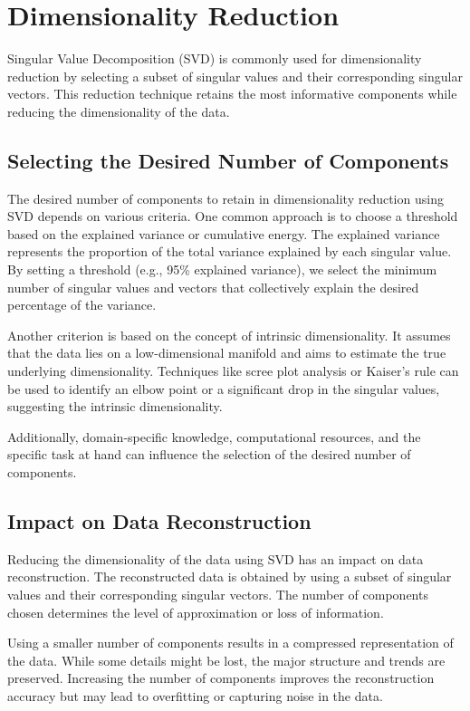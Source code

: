 \documentclass[a4paper]{article}
\begin{document}
{		\section{Dimensionality Reduction}
		Singular Value Decomposition (SVD) is commonly used for dimensionality reduction by selecting a subset of singular values and their corresponding singular vectors. This reduction technique retains the most informative components while reducing the dimensionality of the data.
		
		\subsection{Selecting the Desired Number of Components}
		The desired number of components to retain in dimensionality reduction using SVD depends on various criteria. One common approach is to choose a threshold based on the explained variance or cumulative energy. The explained variance represents the proportion of the total variance explained by each singular value. By setting a threshold (e.g., 95\% explained variance), we select the minimum number of singular values and vectors that collectively explain the desired percentage of the variance.
		
		Another criterion is based on the concept of intrinsic dimensionality. It assumes that the data lies on a low-dimensional manifold and aims to estimate the true underlying dimensionality. Techniques like scree plot analysis or Kaiser's rule can be used to identify an elbow point or a significant drop in the singular values, suggesting the intrinsic dimensionality.
		
		Additionally, domain-specific knowledge, computational resources, and the specific task at hand can influence the selection of the desired number of components.
		
		\subsection{Impact on Data Reconstruction}
		Reducing the dimensionality of the data using SVD has an impact on data reconstruction. The reconstructed data is obtained by using a subset of singular values and their corresponding singular vectors. The number of components chosen determines the level of approximation or loss of information.
		
		Using a smaller number of components results in a compressed representation of the data. While some details might be lost, the major structure and trends are preserved. Increasing the number of components improves the reconstruction accuracy but may lead to overfitting or capturing noise in the data.
		
}
\end{document}
